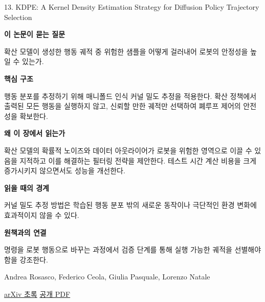 \documentclass[11pt,openany]{book}
\begin{document}
\begin{termcard}{13. KDPE: A Kernel Density Estimation Strategy for Diffusion Policy Trajectory Selection}

\par

\medskip

{\sffamily\bfseries\color{deepblue} 이 논문이 묻는 질문}\par

확산 모델이 생성한 행동 궤적 중 위험한 샘플을 어떻게 걸러내어 로봇의 안정성을 높일 수 있는가.

\smallskip

{\sffamily\bfseries\color{deepblue} 핵심 구조}\par

행동 분포를 추정하기 위해 매니폴드 인식 커널 밀도 추정을 적용한다. 확산 정책에서 출력된 모든 행동을 실행하지 않고, 신뢰할 만한 궤적만 선택하여 폐루프 제어의 안전성을 확보한다.

\smallskip

{\sffamily\bfseries\color{deepblue} 왜 이 장에서 읽는가}\par

확산 모델의 확률적 노이즈와 데이터 아웃라이어가 로봇을 위험한 영역으로 이끌 수 있음을 지적하고 이를 해결하는 필터링 전략을 제안한다. 테스트 시간 계산 비용을 크게 증가시키지 않으면서도 성능을 개선한다.

\smallskip

{\sffamily\bfseries\color{coral} 읽을 때의 경계}\par

커널 밀도 추정 방법은 학습된 행동 분포 밖의 새로운 동작이나 극단적인 환경 변화에 효과적이지 않을 수 있다.

\smallskip

{\sffamily\bfseries\color{teal} 원책과의 연결}\par

명령을 로봇 행동으로 바꾸는 과정에서 검증 단계를 통해 실행 가능한 궤적을 선별해야 함을 강조한다.

\medskip

{\footnotesize\color{muted} Andrea Rosasco, Federico Ceola, Giulia Pasquale, Lorenzo Natale\par

\href{https://arxiv.org/abs/2508.10511}{arXiv 초록} \quad \href{https://arxiv.org/pdf/2508.10511}{공개 PDF}\par}

\end{termcard}
\end{document}
